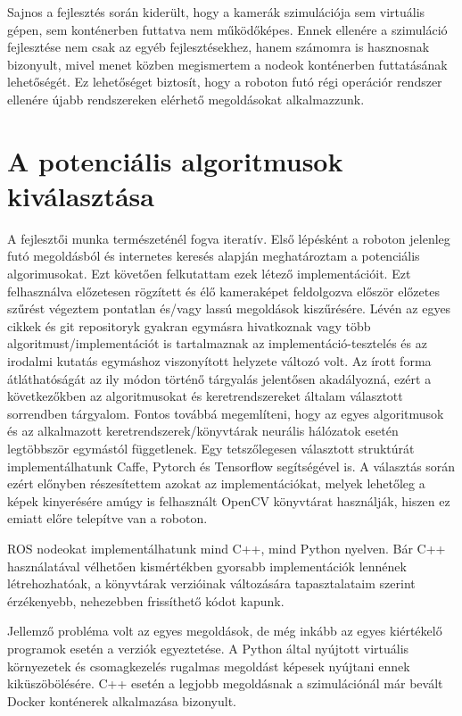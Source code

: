 Sajnos a fejlesztés során kiderült, hogy a kamerák szimulációja sem virtuális gépen, sem konténerben futtatva nem működőképes. Ennek ellenére a szimuláció fejlesztése nem csak az egyéb fejlesztésekhez, hanem számomra is hasznosnak bizonyult, mivel menet közben megismertem a nodeok konténerben futtatásának lehetőségét. Ez lehetőséget biztosít, hogy a roboton futó régi operációr rendszer ellenére újabb rendszereken elérhető megoldásokat alkalmazzunk.

\chapter{A potenciális algoritmusok kiválasztása}

A fejlesztői munka természeténél fogva iteratív. Első lépésként a roboton jelenleg futó megoldásból és internetes keresés alapján meghatároztam a potenciális algorimusokat. Ezt követően felkutattam ezek létező implementációit. Ezt felhasználva előzetesen rögzített és élő kameraképet feldolgozva először előzetes szűrést végeztem pontatlan és/vagy lassú megoldások kiszűrésére. Lévén az egyes cikkek és git repositoryk gyakran egymásra hivatkoznak vagy több algoritmust/implementációt is tartalmaznak az implementáció-tesztelés és az irodalmi kutatás egymáshoz viszonyított helyzete változó volt. Az írott forma átláthatóságát az ily módon történő tárgyalás jelentősen akadályozná, ezért a következőkben az algoritmusokat és keretrendszereket általam választott sorrendben tárgyalom. Fontos továbbá megemlíteni, hogy az egyes algoritmusok és az alkalmazott keretrendszerek/könyvtárak neurális hálózatok esetén legtöbbször egymástól függetlenek. Egy tetszőlegesen választott struktúrát implementálhatunk Caffe, Pytorch és Tensorflow segítségével is. A választás során ezért előnyben részesítettem azokat az implementációkat, melyek lehetőleg a képek kinyerésére amúgy is felhasznált OpenCV\cite{noauthor_opencvopencv_2021} könyvtárat használják, hiszen ez emiatt előre telepítve van a roboton.

ROS nodeokat implementálhatunk mind C++, mind Python nyelven. Bár C++ használatával vélhetően kismértékben gyorsabb implementációk lennének létrehozhatóak, a könyvtárak verzióinak változására tapasztalataim szerint érzékenyebb, nehezebben frissíthető kódot kapunk.

Jellemző probléma volt az egyes megoldások, de még inkább az egyes kiértékelő programok esetén a verziók egyeztetése. A Python által nyújtott virtuális környezetek és csomagkezelés rugalmas megoldást képesek nyújtani ennek kiküszöbölésére. C++ esetén a legjobb megoldásnak a szimulációnál már bevált Docker konténerek alkalmazása bizonyult.

